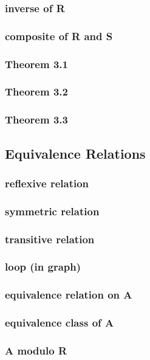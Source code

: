 \documentclass[a4paper]{article}
\begin{document}
\subsubsection*{inverse of R}
\subsubsection*{composite of R and S}
\subsubsection*{Theorem 3.1}
\subsubsection*{Theorem 3.2}
\subsubsection*{Theorem 3.3}

\newpage
\subsection{Equivalence Relations}   %
\subsubsection*{reflexive relation}
\subsubsection*{symmetric relation}
\subsubsection*{transitive relation}
\subsubsection*{loop (in graph)}
\subsubsection*{equivalence relation on A}
\subsubsection*{equivalence class of A}
\subsubsection*{A modulo R}
\end{document}
